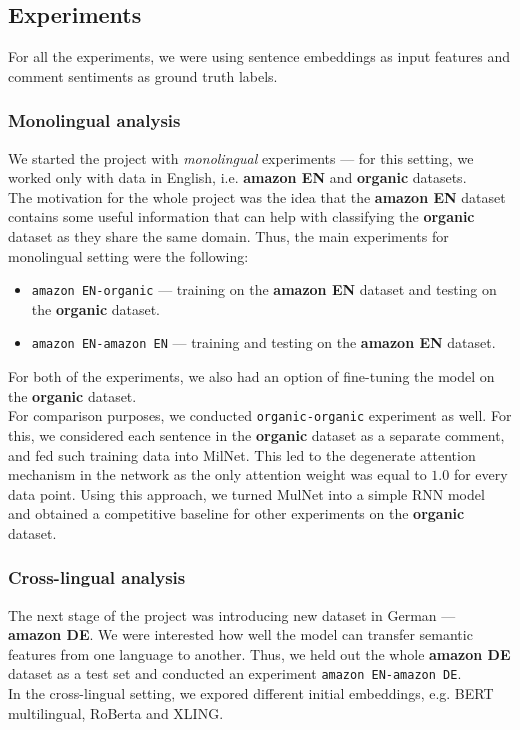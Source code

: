 \subsection{Experiments}
\label{experimentsSection}
For all the experiments, we were using sentence embeddings as input features and comment sentiments as ground truth labels.
\subsubsection{Monolingual analysis}
We started the project with {\it monolingual} experiments --- for this setting, we worked only with data in English, i.e. {\bf amazon EN} and {\bf organic} datasets. \\
The motivation for the whole project was the idea that the {\bf amazon EN} dataset contains some useful information that can help with classifying the {\bf organic} dataset as they share the same domain. Thus, the main experiments for monolingual setting were the following:
\begin{itemize}
    \item {\tt amazon EN-organic} --- training on the {\bf amazon EN} dataset and testing on the {\bf organic} dataset.
    \item {\tt amazon EN-amazon EN} --- training and testing on the {\bf amazon EN} dataset.
\end{itemize}
For both of the experiments, we also had an option of fine-tuning the model on the {\bf organic} dataset. \\
For comparison purposes, we conducted {\tt organic-organic} experiment as well. For this, we considered each sentence in the {\bf organic} dataset as a separate comment, and fed such training data into MilNet. This led to the degenerate attention mechanism in the network as the only attention weight was equal to $1.0$ for every data point. Using this approach, we turned MulNet into a simple RNN model and obtained a competitive baseline for other experiments on the {\bf organic} dataset.

\subsubsection{Cross-lingual analysis}
The next stage of the project was introducing new dataset in German --- {\bf amazon DE}. We were interested how well the model can transfer semantic features from one language to another. Thus, we held out the whole {\bf amazon DE} dataset as a test set and conducted an experiment {\tt amazon EN-amazon DE}. \\
In the cross-lingual setting, we expored different initial embeddings, e.g. BERT multilingual, RoBerta and XLING.
